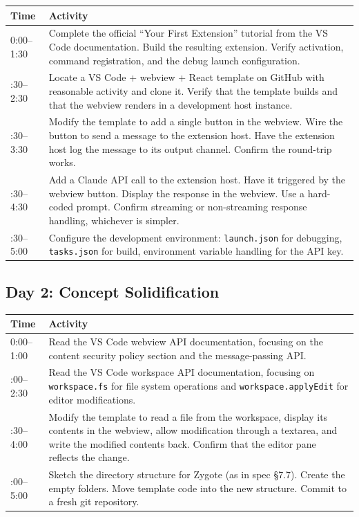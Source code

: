\documentclass[11pt,letterpaper]{article}
\begin{document}
\begin{tabularx}{\textwidth}{@{}lX@{}}
\toprule
\textbf{Time} & \textbf{Activity} \\
\midrule
0:00--1:30 & Complete the official ``Your First Extension'' tutorial from the VS Code documentation. Build the resulting extension. Verify activation, command registration, and the debug launch configuration. \\
\addlinespace
1:30--2:30 & Locate a VS Code + webview + React template on GitHub with reasonable activity and clone it. Verify that the template builds and that the webview renders in a development host instance. \\
\addlinespace
2:30--3:30 & Modify the template to add a single button in the webview. Wire the button to send a message to the extension host. Have the extension host log the message to its output channel. Confirm the round-trip works. \\
\addlinespace
3:30--4:30 & Add a Claude API call to the extension host. Have it triggered by the webview button. Display the response in the webview. Use a hard-coded prompt. Confirm streaming or non-streaming response handling, whichever is simpler. \\
\addlinespace
4:30--5:00 & Configure the development environment: \texttt{launch.json} for debugging, \texttt{tasks.json} for build, environment variable handling for the API key. \\
\bottomrule
\end{tabularx}

\subsection*{Day 2: Concept Solidification}

\begin{tabularx}{\textwidth}{@{}lX@{}}
\toprule
\textbf{Time} & \textbf{Activity} \\
\midrule
0:00--1:00 & Read the VS Code webview API documentation, focusing on the content security policy section and the message-passing API. \\
\addlinespace
1:00--2:30 & Read the VS Code workspace API documentation, focusing on \texttt{workspace.fs} for file system operations and \texttt{workspace.applyEdit} for editor modifications. \\
\addlinespace
2:30--4:00 & Modify the template to read a file from the workspace, display its contents in the webview, allow modification through a textarea, and write the modified contents back. Confirm that the editor pane reflects the change. \\
\addlinespace
4:00--5:00 & Sketch the directory structure for Zygote (as in spec §7.7). Create the empty folders. Move template code into the new structure. Commit to a fresh git repository. \\
\bottomrule
\end{tabularx}
\end{document}
